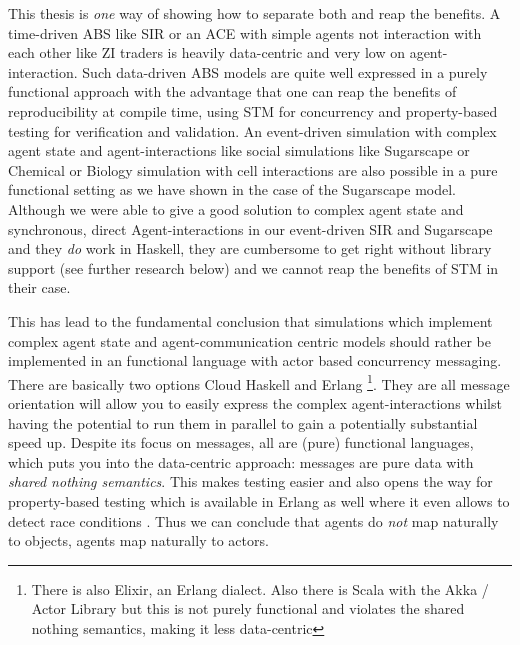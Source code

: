 \medskip

This thesis is \textit{one} way of showing how to separate both and reap the benefits. A time-driven ABS like SIR or an ACE with simple agents not interaction with each other like ZI traders is heavily data-centric and very low on agent-interaction. Such data-driven ABS models are quite well expressed in a purely functional approach with the advantage that one can reap the benefits of reproducibility at compile time, using STM for concurrency and property-based testing for verification and validation. An event-driven simulation with complex agent state and agent-interactions like social simulations like Sugarscape or Chemical or Biology simulation with cell interactions are also possible in a pure functional setting as we have shown in the case of the Sugarscape model. Although we were able to give a good solution to complex agent state and synchronous, direct Agent-interactions in our event-driven SIR and Sugarscape and they \textit{do} work in Haskell, they are cumbersome to get right without library support (see further research below) and we cannot reap the benefits of STM in their case. 

This has lead to the fundamental conclusion that simulations which implement complex agent state and agent-communication centric models should rather be implemented in an functional language with actor based concurrency messaging. There are basically two options Cloud Haskell and Erlang \footnote{There is also Elixir, an Erlang dialect. Also there is Scala with the Akka / Actor Library but this is not purely functional and violates the shared nothing semantics, making it less data-centric}.
They are all message orientation will allow you to easily express the complex agent-interactions whilst having the potential to run them in parallel to gain a potentially substantial speed up. Despite its focus on messages, all are (pure) functional languages, which puts you into the data-centric approach: messages are pure data with \textit{shared nothing semantics}. This makes testing easier and also opens the way for property-based testing which is available in Erlang as well where it even allows to detect race conditions \cite{claessen_finding_2009}. Thus we can conclude that agents do \textit{not} map naturally to objects, agents map naturally to actors. 


